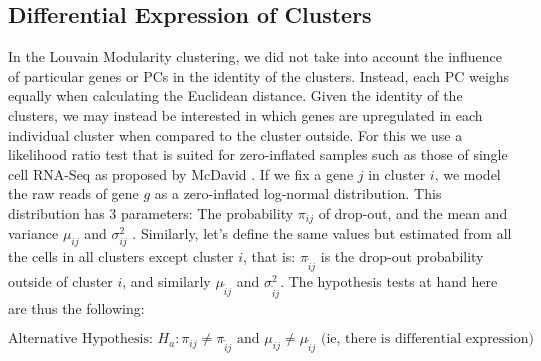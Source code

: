 \subsection{Differential Expression of Clusters}
In the Louvain Modularity clustering, we did not take into account the influence of particular genes or PCs in the identity of the clusters. Instead, each PC weighs equally when calculating the Euclidean distance. Given the identity of the clusters, we may instead be interested in which genes are upregulated in each individual cluster when compared to the cluster outside. For this we use a likelihood ratio test that is suited for zero-inflated samples such as those of single cell RNA-Seq as proposed by McDavid  \cite{mcdavid2013data}. If we fix a gene $j$ in cluster $i$, we model the raw reads of gene $g$ as a zero-inflated log-normal distribution. This distribution has 3 parameters: The probability $\pi_{ij}$ of drop-out, and the mean and variance $\mu_{ij}$  and $\sigma_{ij}^{2}$ . Similarly, let's define the same values but estimated from all the cells in all clusters except cluster $i$, that is: $\pi_{\tilde{i}j}$ is the drop-out probability outside of cluster $i$, and similarly $\mu_{\tilde{i}j}$ and $\sigma_{\tilde{i}j}^2$. The hypothesis tests at hand here are thus the following:

$$
\mbox{Alternative Hypothesis: } H_a: \pi_{ij} \neq \pi_{\tilde{i}j} \mbox{ and } \mu_{ij} \neq \mu_{\tilde{i}j}\mbox{ (ie, there is differential expression) }
$$

